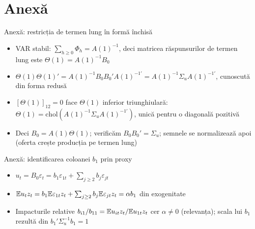 \section{Anexă}

\begin{frame}{Anexă: restricția de termen lung în formă închisă}
\hypertarget{atsapp1}{}
\itemsize{\small}
\begin{itemize}
    \item VAR stabil: $\sum_{h\ge0}\Phi_h = A(1)^{-1}$, deci matricea răspunsurilor de termen lung este $\Theta(1) = A(1)^{-1}B_0$
    \item $\Theta(1)\Theta(1)' = A(1)^{-1}B_0B_0'A(1)^{-1\prime} = A(1)^{-1}\Sigma_uA(1)^{-1\prime}$, cunoscută din forma redusă
    \item $[\Theta(1)]_{12} = 0$ face $\Theta(1)$ inferior triunghiulară: $\Theta(1) = \mathrm{chol}(A(1)^{-1}\Sigma_uA(1)^{-1\prime})$, unică pentru o diagonală pozitivă
    \item Deci $B_0 = A(1)\Theta(1)$; verificăm $B_0B_0' = \Sigma_u$; semnele se normalizează apoi (oferta crește producția pe termen lung)
\end{itemize}
\end{frame}

\begin{frame}{Anexă: identificarea coloanei $b_1$ prin proxy}
\hypertarget{atsapp2}{}
\itemsize{\small}
\begin{itemize}
    \item $u_t = B_0\varepsilon_t = b_1\varepsilon_{1t} + \sum_{j\ge2}b_j\varepsilon_{jt}$
    \item $\mathbb{E} u_tz_t = b_1\mathbb{E}\varepsilon_{1t}z_t + \sum_{j\ge2}b_j\mathbb{E}\varepsilon_{jt}z_t = \alpha b_1$ din exogenitate
    \item Impacturile relative $b_{i1}/b_{11} = \mathbb{E} u_{it}z_t/\mathbb{E} u_{1t}z_t$ cer $\alpha \ne 0$ (relevanța); scala lui $b_1$ rezultă din $b_1'\Sigma_u^{-1}b_1 = 1$
\end{itemize}
\end{frame}

